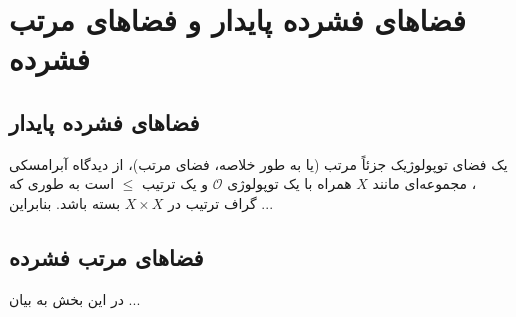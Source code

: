 \chapter{فضاهای فشرده پایدار و فضاهای مرتب فشرده}
\thispagestyle{empty}
\section{فضاهای فشرده پایدار}
یک فضای توپولوژیک جزئاً مرتب (یا به طور خلاصه، فضای مرتب)، از دیدگاه آبرامسکی
\cite{abramsky2}،
مجموعه‌ای مانند $ X $ همراه 
با یک توپولوژی $ \mathcal{O} $ و یک ترتیب $ \leq $ است به طوری که گراف ترتیب در $X\times X  $ بسته باشد. بنابراین ...
\section{فضاهای مرتب فشرده}
در این  بخش به بیان ...